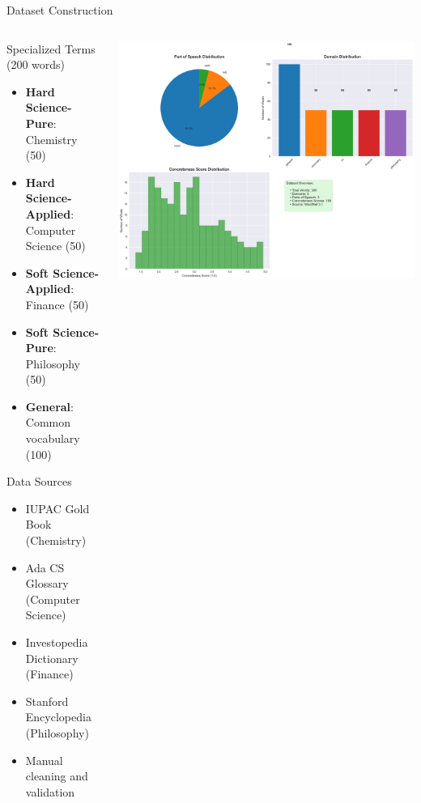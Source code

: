 \documentclass[aspectratio=169]{beamer}
\begin{document}
\begin{frame}{Dataset Construction}
\begin{columns}[c]
\begin{column}{0.5\textwidth}
\begin{block}{Specialized Terms (200 words)}
\small
\begin{itemize}
    \item \textbf{Hard Science-Pure}: Chemistry (50)
    \item \textbf{Hard Science-Applied}: Computer Science (50)
    \item \textbf{Soft Science-Applied}: Finance (50)
    \item \textbf{Soft Science-Pure}: Philosophy (50)
    \item \textbf{General}: Common vocabulary (100)
\end{itemize}
\end{block}

\begin{block}{Data Sources}
\tiny
\begin{itemize}
    \item IUPAC Gold Book (Chemistry)
    \item Ada CS Glossary (Computer Science)
    \item Investopedia Dictionary (Finance)
    \item Stanford Encyclopedia (Philosophy)
    \item Manual cleaning and validation
\end{itemize}
\end{block}
\end{column}

\begin{column}{0.48\textwidth}
\begin{center}
\includegraphics[width=\textwidth]{presentation_figures/figure2_dataset_distribution.png}
\end{center}
\end{column}
\end{columns}
\end{frame}
\end{document}
